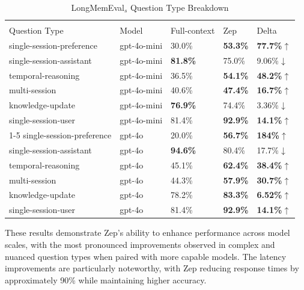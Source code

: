\documentclass{article}
\begin{document}
\begin{table}[h]
 \caption{LongMemEval$_{s}$ Question Type Breakdown}
  \centering
  \begin{tabular}{lllll}
    \toprule
    \multicolumn{2}{c}{}                   \\
    Question Type & Model & Full-context & Zep  & Delta\\
    \midrule
    single-session-preference & gpt-4o-mini & 30.0\% & \textbf{53.3\%} & \textbf{77.7\%$\uparrow$}
    \\
    single-session-assistant & gpt-4o-mini & \textbf{81.8\%} & 75.0\% & 9.06\%$\downarrow$
    \\
    temporal-reasoning & gpt-4o-mini & 36.5\%  & \textbf{54.1\%} & \textbf{48.2\%$\uparrow$}
    \\
    multi-session & gpt-4o-mini & 40.6\% & \textbf{47.4\%} & \textbf{16.7\%$\uparrow$}
    \\
    knowledge-update & gpt-4o-mini & \textbf{76.9\%} & 74.4\% & 3.36\%$\downarrow$
    \\
    single-session-user & gpt-4o-mini & 81.4\%  & \textbf{92.9\%} & \textbf{14.1\%$\uparrow$}
    \\
    \cmidrule(r){1-5}
    single-session-preference & gpt-4o & 20.0\% & \textbf{56.7\%} & \textbf{184\%$\uparrow$}
    \\
    single-session-assistant & gpt-4o & \textbf{94.6\%} & 80.4\% & 17.7\%$\downarrow$
    \\
    temporal-reasoning & gpt-4o & 45.1\%  & \textbf{62.4\%} & \textbf{38.4\%$\uparrow$}
    \\
    multi-session & gpt-4o & 44.3\% & \textbf{57.9\%} & \textbf{30.7\%$\uparrow$}
    \\
    knowledge-update & gpt-4o & 78.2\% & \textbf{83.3\%} & \textbf{6.52\%$\uparrow$}
    \\
    single-session-user & gpt-4o & 81.4\%  & \textbf{92.9\%} & \textbf{14.1\%$\uparrow$}
    \\
    \bottomrule
  \end{tabular}
  \label{tab:lmefull}
\end{table}

These results demonstrate Zep's ability to enhance performance across model scales, with the most pronounced improvements observed in complex and nuanced question types when paired with more capable models. The latency improvements are particularly noteworthy, with Zep reducing response times by approximately 90\% while maintaining higher accuracy.
\end{document}
